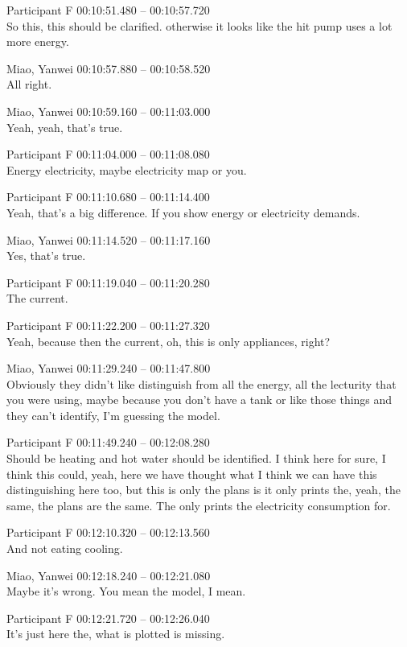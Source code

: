 {Participant F 00:10:51.480 -- 00:10:57.720 \\
So this, this should be clarified. otherwise it looks like the hit pump uses a lot more energy.

Miao, Yanwei 00:10:57.880 -- 00:10:58.520 \\
All right.

Miao, Yanwei 00:10:59.160 -- 00:11:03.000 \\
Yeah, yeah, that's true.

Participant F 00:11:04.000 -- 00:11:08.080 \\
Energy electricity, maybe electricity map or you.

Participant F 00:11:10.680 -- 00:11:14.400 \\
Yeah, that's a big difference. If you show energy or electricity demands.

Miao, Yanwei 00:11:14.520 -- 00:11:17.160 \\
Yes, that's true.

Participant F 00:11:19.040 -- 00:11:20.280 \\
The current.

Participant F 00:11:22.200 -- 00:11:27.320 \\
Yeah, because then the current, oh, this is only appliances, right?

Miao, Yanwei 00:11:29.240 -- 00:11:47.800 \\
Obviously they didn't like distinguish from all the energy, all the lecturity that you were using, maybe because you don't have a tank or like those things and they can't identify, I'm guessing the model.

Participant F 00:11:49.240 -- 00:12:08.280 \\
Should be heating and hot water should be identified. I think here for sure, I think this could, yeah, here we have thought what I think we can have this distinguishing here too, but this is only the plans is it only prints the, yeah, the same, the plans are the same. The only prints the electricity consumption for.

Participant F 00:12:10.320 -- 00:12:13.560 \\
And not eating cooling.

Miao, Yanwei 00:12:18.240 -- 00:12:21.080 \\
Maybe it's wrong. You mean the model, I mean.

Participant F 00:12:21.720 -- 00:12:26.040 \\
It's just here the, what is plotted is missing.

}

